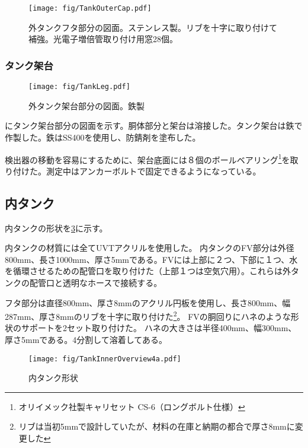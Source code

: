 \begin{figure}[htbp]
\centering
\texttt{[image: fig/TankOuterCap.pdf]}
\caption[外タンクフタ部分の図面]{外タンクフタ部分の図面。ステンレス製。リブを十字に取り付けて補強。光電子増倍管取り付け用窓28個。}
\label{TankOuterCap}
\end{figure}

\subsubsection{タンク架台}

\begin{figure}[htbp]
\centering
\texttt{[image: fig/TankLeg.pdf]}
\caption[外タンク架台部分の図面]{外タンク架台部分の図面。鉄製}
\label{TankLeg}
\end{figure}

にタンク架台部分の図面を示す。胴体部分と架台は溶接した。タンク架台は鉄で作製した。鉄はSS400を使用し、防錆剤を塗布した。

検出器の移動を容易にするために、架台底面には８個のボールベアリング\footnote{オリイメック社製キャリセット CS-6（ロングボルト仕様）}を取り付けた。測定中はアンカーボルトで固定できるようになっている。


\newpage
\subsection{内タンク}
内タンクの形状を\ref{InnerTankOverview}に示す。

内タンクの材質には全てUVTアクリルを使用した。
内タンクのFV部分は外径800mm、長さ1000mm、厚さ5mmである。FVには上部に２つ、下部に１つ、水を循環させるための配管口を取り付けた（上部１つは空気穴用）。これらは外タンクの配管口と透明なホースで接続する。

フタ部分は直径800mm、厚さ8mmのアクリル円板を使用し、長さ800mm、幅287mm、厚さ8mmのリブを十字に取り付けた\footnote{リブは当初5mmで設計していたが、材料の在庫と納期の都合で厚さ8mmに変更した}。
FVの胴回りにハネのような形状のサポートを2セット取り付けた。
ハネの大きさは半径400mm、幅300mm、厚さ5mmである。4分割して溶着してある。

\begin{figure}[htbp]
\centering
\texttt{[image: fig/TankInnerOverview4a.pdf]}
\caption[内タンク形状]{内タンク形状}
\label{InnerTankOverview}
\end{figure}
\newpage
